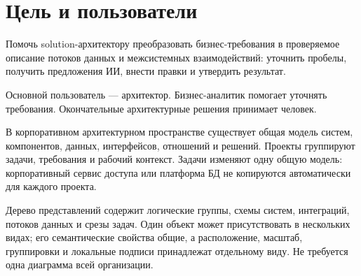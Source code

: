 \documentclass[10pt,a4paper]{article}
\begin{document}
\section{Цель и пользователи}\label{ux446ux435ux43bux44c-ux438-ux43fux43eux43bux44cux437ux43eux432ux430ux442ux435ux43bux438}

Помочь solution-архитектору преобразовать бизнес-требования в проверяемое описание потоков данных и межсистемных взаимодействий: уточнить пробелы, получить предложения ИИ, внести правки и утвердить результат.

Основной пользователь --- архитектор. Бизнес-аналитик помогает уточнять требования. Окончательные архитектурные решения принимает человек.

В корпоративном архитектурном пространстве существует общая модель систем, компонентов, данных, интерфейсов, отношений и решений. Проекты группируют задачи, требования и рабочий контекст. Задачи изменяют одну общую модель: корпоративный сервис доступа или платформа БД не копируются автоматически для каждого проекта.

Дерево представлений содержит логические группы, схемы систем, интеграций, потоков данных и срезы задач. Один объект может присутствовать в нескольких видах; его семантические свойства общие, а расположение, масштаб, группировки и локальные подписи принадлежат отдельному виду. Не требуется одна диаграмма всей организации.

\end{document}
